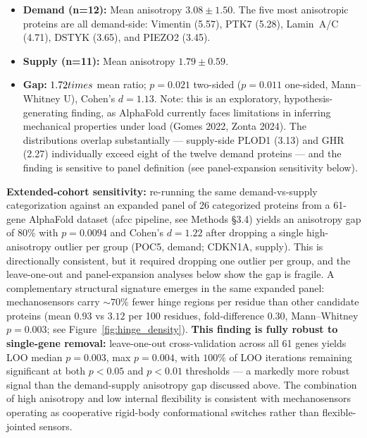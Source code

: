 \begin{itemize}
    \item \textbf{Demand (n=12):} Mean anisotropy $3.08 \pm 1.50$. The five most anisotropic proteins are all demand-side: Vimentin (5.57), PTK7 (5.28), Lamin~A/C (4.71), DSTYK (3.65), and PIEZO2 (3.45).
    \item \textbf{Supply (n=11):} Mean anisotropy $1.79 \pm 0.59$.
    \item \textbf{Gap:} $1.72\\times$ mean ratio; $p = 0.021$ two-sided ($p = 0.011$ one-sided, Mann--Whitney U), Cohen's $d = 1.13$. Note: this is an exploratory, hypothesis-generating finding, as AlphaFold currently faces limitations in inferring mechanical properties under load (Gomes 2022, Zonta 2024). The distributions overlap substantially --- supply-side PLOD1 (3.13) and GHR (2.27) individually exceed eight of the twelve demand proteins --- and the finding is sensitive to panel definition (see panel-expansion sensitivity below).
\end{itemize}

\textbf{Extended-cohort sensitivity:} re-running the same demand-vs-supply categorization against an expanded panel of 26 categorized proteins from a 61-gene AlphaFold dataset (afcc pipeline, see Methods §3.4) yields an anisotropy gap of 80\% with $p = 0.0094$ and Cohen's $d = 1.22$ after dropping a single high-anisotropy outlier per group (POC5, demand; CDKN1A, supply). This is directionally consistent, but it required dropping one outlier per group, and the leave-one-out and panel-expansion analyses below show the gap is fragile. A complementary structural signature emerges in the same expanded panel: mechanosensors carry $\sim 70\%$ fewer hinge regions per residue than other candidate proteins (mean $0.93$ vs $3.12$ per 100 residues, fold-difference $0.30$, Mann--Whitney $p = 0.003$; see Figure~\ref{fig:hinge_density}). \textbf{This finding is fully robust to single-gene removal:} leave-one-out cross-validation across all 61 genes yields LOO median $p = 0.003$, max $p = 0.004$, with $100\%$ of LOO iterations remaining significant at both $p<0.05$ and $p<0.01$ thresholds --- a markedly more robust signal than the demand-supply anisotropy gap discussed above. The combination of high anisotropy and low internal flexibility is consistent with mechanosensors operating as cooperative rigid-body conformational switches rather than flexible-jointed sensors.

